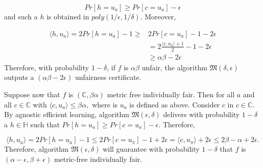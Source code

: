 \documentclass{article}
\begin{document}
$$ Pr[h=u_{a}] \geq Pr[c=u_{a}]- \epsilon$$ and such a $h$ is obtained in $poly(1/\epsilon, 1/\delta).$ Moreover, 

\begin{equation}
\begin{split}
     \langle h, u_{a} \rangle = 2Pr[h=u_{a}] -1 \geq &2 Pr[c=u_{a}] - 1 - 2\epsilon \\
     & = 2\frac{\langle c, u_{a}\rangle + 1}{2} -1 -2\epsilon \\
     & \geq \alpha\beta - 2\epsilon
    \end{split}
\end{equation}
Therefore, with probability $1-\delta$, if $f$ is $\alpha\beta$ unfair, the algorithm $\mathfrak{M}(\delta, \epsilon)$ outputs a $(\alpha\beta-2\epsilon)$ unfairness certificate. 

\bigskip
Suppose now that $f$ is $(\mathbb{C}, \beta\alpha)$ metric free individually fair. Then for all $a$ and all $c\in \mathbb{C}$ with $\langle c, u_{a}\rangle \leq \beta\alpha,$ where is $u_{a}$ is defined as above. Consider $c$ in  $c\in \mathbb{C}$. By agnostic efficient learning, algorithm $\mathfrak{M}(\epsilon, \delta)$ delivers with probability $1-\delta$ a $h\in \mathbb{H}$ such that $ Pr[h=u_{a}]\geq Pr[c=u_{a}]-\epsilon.$ Therefore,  

$$\langle h, u_{a}\rangle =  2 Pr[h=u_{a}] -1 \leq 2Pr[c=u_{\pi}] - 1 + 2\epsilon  = \langle c, u_{\pi} \rangle + 2\epsilon \leq 2\beta -\alpha + 2\epsilon.$$
Therefore, algorithm $\mathfrak{M}(\epsilon, \delta)$ will guarantee with probability $1-\delta$ that $f$ is $(\alpha-\epsilon, \beta + \epsilon)$ metric-free individually fair. 



\end{document}
